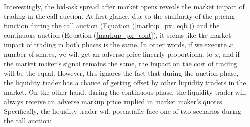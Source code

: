 \documentclass{article}
\begin{document}
Interestingly, the bid-ask spread after market opens reveals the market impact of trading in the call auction. At first glance, due to the similarity of the pricing function during the call auction (Equation (\ref{markup_px_eqb})) and the continuous auction (Equation (\ref{markup_px_cont}), it seems like the market impact of trading in both phases is the same. In other words, if we execute $x$ number of shares, we will get an adverse price linearly proportional to $x$, and if the market maker's signal remains the same, the impact on the cost of trading will be the equal. However, this ignores the fact that during the auction phase, the liquidity trader has a chance of getting offset by other liquidity traders in the market. On the other hand, during the continuous phase, the liquidity trader will always receive an adverse markup price implied in market maker's quotes. Specifically, the liquidity trader will potentially face one of two scenarios during the call auction:
\end{document}
